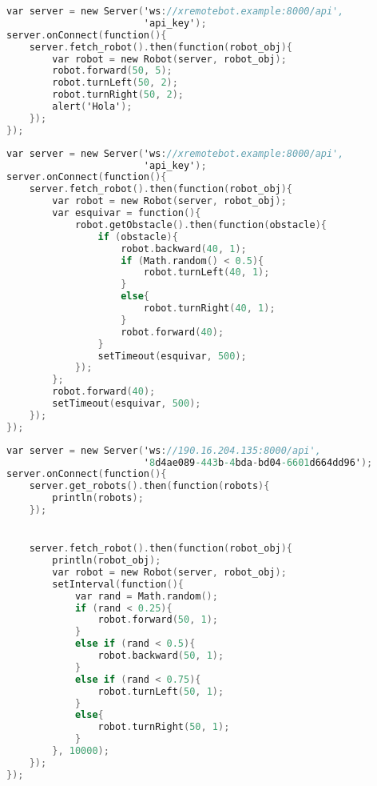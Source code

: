 \begin{lstlisting}[language=C,
caption={Secuencia de movimientos},
label=lst:movimientos_js]
var server = new Server('ws://xremotebot.example:8000/api',
                        'api_key');
server.onConnect(function(){
	server.fetch_robot().then(function(robot_obj){
		var robot = new Robot(server, robot_obj);
        robot.forward(50, 5);
        robot.turnLeft(50, 2);
        robot.turnRight(50, 2);
        alert('Hola');
	});
});
\end{lstlisting}

\begin{lstlisting}[language=C,
caption={Ante un obstáculo el robot lo esquiva girando en un dirección aleatoria},
label=lst:esquivar_js]
var server = new Server('ws://xremotebot.example:8000/api',
                        'api_key');
server.onConnect(function(){
    server.fetch_robot().then(function(robot_obj){
        var robot = new Robot(server, robot_obj);
        var esquivar = function(){
            robot.getObstacle().then(function(obstacle){
                if (obstacle){
                    robot.backward(40, 1);
                    if (Math.random() < 0.5){
                        robot.turnLeft(40, 1);
                    }
                    else{
                        robot.turnRight(40, 1);
                    }
                    robot.forward(40);
                }
                setTimeout(esquivar, 500);
            });
        };
        robot.forward(40);
        setTimeout(esquivar, 500);
    });
});
\end{lstlisting}

\begin{lstlisting}[language=C,
caption={El robot se mueve en direcciones aleatorias},
label=lst:random_js]
var server = new Server('ws://190.16.204.135:8000/api',
                        '8d4ae089-443b-4bda-bd04-6601d664dd96');
server.onConnect(function(){
    server.get_robots().then(function(robots){
        println(robots);
    });


    server.fetch_robot().then(function(robot_obj){
        println(robot_obj);
        var robot = new Robot(server, robot_obj);
        setInterval(function(){
            var rand = Math.random();
            if (rand < 0.25){
                robot.forward(50, 1);
            }
            else if (rand < 0.5){
                robot.backward(50, 1);
            }
            else if (rand < 0.75){
                robot.turnLeft(50, 1);
            }
            else{
                robot.turnRight(50, 1);
            }
        }, 10000);
    });
});
\end{lstlisting}


